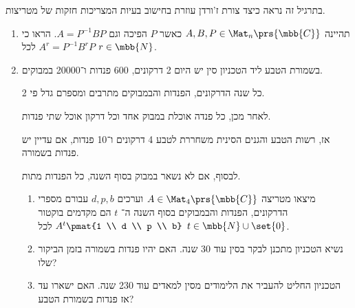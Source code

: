 \documentclass[a4paper,10pt,twoside,openany]{article}
\begin{document}
\begin{exercise}
בתרגיל זה נראה כיצד צורת ז'ורדן עוזרת בחישוב בעיות המצריכות חזקות של מטריצות.

\begin{enumerate}
\item
תהיינה
$A,B,P \in \Mat_n\prs{\mbb{C}}$
כאשר
$P$
הפיכה וגם
$A = P^{-1} B P$.
הראו כי
$A^r = P^{-1} B^r P$
לכל
$r \in \mbb{N}$.

\item
בשמורת הטבע ליד הטכניון סין יש היום 2 דרקונים, 600 פנדות ו־20000 במבוקים.

כל שנה הדרקונים, הפנדות והבמבוקים מתרבים ומספרם גדל פי 2.

לאחר מכן, כל פנדה אוכלת במבוק אחד וכל דרקון אוכל שתי פנדות.

אז, רשות הטבע והגנים הסינית משחררת לטבע 4 דרקונים ו־10 פנדות, אם עדיין יש פנדות בשמורה.

לבסוף, אם לא נשאר במבוק בסוף השנה, כל הפנדות מתות.

\begin{enumerate}
\item
מיצאו מטריצה
$A \in \Mat_4\prs{\mbb{C}}$
וערכים
$d,p,b$
עבורם מספרי הדרקונים, הפנדות והבמבוקים בסוף השנה ה־%
$t$
הם מקדמים בוקטור
$A^t \pmat{1 \\ d \\ p \\ b}$
לכל
$t \in \mbb{N} \cup \set{0}$.

\item נשיא הטכניון מתכנן לבקר בסין עוד 30 שנה. האם יהיו פנדות בשמורה בזמן הביקור שלו?

\item הטכניון החליט להעביר את הלימודים מסין למאדים עוד 230 שנה. האם ישארו עד אז פנדות בשמורת הטבע?
\end{enumerate}
\end{enumerate}
\end{exercise}
\end{document}
